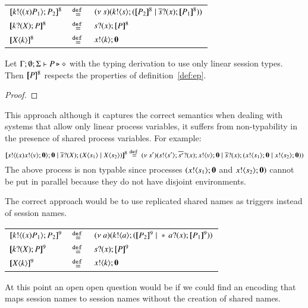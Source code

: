 \begin{definition}

	\begin{tabular}{lcl}
		$[\!\![k ! \langle (x)P_1 \rangle ; P_2]\!\!]^{8}$ &$\stackrel{\mathtt{def}\ }{=}$& $ \newsp{s}{\bout{k}{s} (\map{P_2}^8 \Par \binp{\dual{s}}{x} \map{P_1}^8)} $\\
		$[\!\![k ? (X) ; P]\!\!]^{8}$ &$\stackrel{\mathtt{def}\ }{=}$& $s ? (x) ; [\!\![P]\!\!]^8$\\
		$[\!\![X\langle k \rangle]\!\!]^8$ &$\stackrel{\mathtt{def}\ }{=}$& $x ! \langle k \rangle ; \mathbf{0}$
	\end{tabular}
\end{definition}

\begin{proposition}
	Let $\Gamma;\emptyset;\Sigma \vdash P \triangleright \diamond$ with
	the typing derivation to use only linear session types. Then
	$[\!\![P]\!\!]^8$ respects the properties of definition~\ref{def:ep}.
\end{proposition}

\begin{proof}
\end{proof}

This approach although it captures the correct semantics when
dealing with systems that allow only linear process variables,
it suffers from non-typability in the presence
of shared process variables. For example:
\[
	[\!\![s ! \langle (x)x ! \langle v \rangle ;\mathbf{0} \rangle ; \mathbf{0} \;|\; \overline{s} ? (X) ; (X\langle s_1 \rangle \;|\; X\langle s_2 \rangle)]\!\!]^8 \stackrel{\mathtt{def}\ }{=}
	(\nu\ s')(s ! \langle s' \rangle ; \overline{s'} ? (x) ; x ! \langle v \rangle ; \mathbf{0} \;|\; \overline{s} ? (x) ; (x ! \langle s_1 \rangle ; \mathbf{0} \;|\; x ! \langle s_2 \rangle ; \mathbf{0}))
\]
The above process is non typable since processes $(x ! \langle s_1 \rangle ; \mathbf{0}$ and $x ! \langle s_2 \rangle ; \mathbf{0})$
cannot be put in parallel because they do not have disjoint environments.

The correct approach would be to use replicated shared names
as triggers instead of session names. 

\begin{definition}

	\begin{tabular}{lcl}
		$[\!\![k ! \langle (x)P_1 \rangle ; P_2]\!\!]^{9}$ &$\stackrel{\mathtt{def}\ }{=}$& $ \newsp{a}{\bout{k}{a} (\map{P_2}^9 \Par \repl{} \binp{a}{x}  \map{P_1}^9)} $\\
		$[\!\![k ? (X) ; P]\!\!]^{9}$ &$\stackrel{\mathtt{def}\ }{=}$& $s ? (x) ; [\!\![P]\!\!]^9$\\
		$[\!\![X\langle k \rangle]\!\!]^9$ &$\stackrel{\mathtt{def}\ }{=}$& $x ! \langle k \rangle ; \mathbf{0}$
	\end{tabular}
\end{definition}

At this point an open open question would be if
we could find an encoding that maps
session names to session names without the creation
of shared names.



